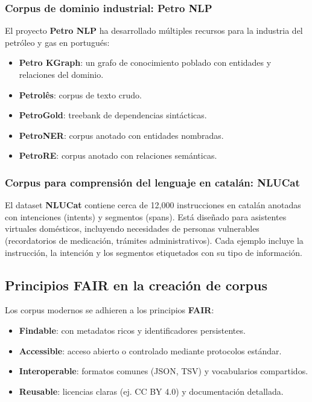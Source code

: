 \documentclass[12pt,a4paper,openany,oneside]{book}
\begin{document}
\subsubsection{Corpus de dominio industrial: Petro NLP}
El proyecto \textbf{Petro NLP} ha desarrollado múltiples recursos para la industria del petróleo y gas en portugués:
\begin{itemize}
    \item \textbf{Petro KGraph}: un grafo de conocimiento poblado con entidades y relaciones del dominio.
    \item \textbf{Petrolês}: corpus de texto crudo.
    \item \textbf{PetroGold}: treebank de dependencias sintácticas.
    \item \textbf{PetroNER}: corpus anotado con entidades nombradas.
    \item \textbf{PetroRE}: corpus anotado con relaciones semánticas.
\end{itemize}

\subsubsection{Corpus para comprensión del lenguaje en catalán: NLUCat}
El dataset \textbf{NLUCat} contiene cerca de 12,000 instrucciones en catalán anotadas con intenciones (intents) y segmentos (spans). Está diseñado para asistentes virtuales domésticos, incluyendo necesidades de personas vulnerables (recordatorios de medicación, trámites administrativos). Cada ejemplo incluye la instrucción, la intención y los segmentos etiquetados con su tipo de información.

\subsection{Principios FAIR en la creación de corpus}
Los corpus modernos se adhieren a los principios \textbf{FAIR}:
\begin{itemize}
    \item \textbf{Findable}: con metadatos ricos y identificadores persistentes.
    \item \textbf{Accessible}: acceso abierto o controlado mediante protocolos estándar.
    \item \textbf{Interoperable}: formatos comunes (JSON, TSV) y vocabularios compartidos.
    \item \textbf{Reusable}: licencias claras (ej. CC BY 4.0) y documentación detallada.
\end{itemize}
\end{document}
